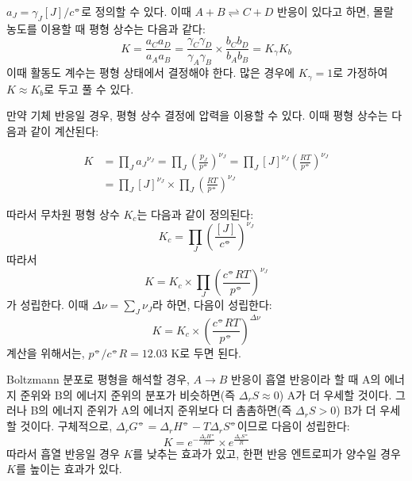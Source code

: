         $a_J = \gamma_J \left[ J \right]/c^\circlehbar$로 정의할 수 있다. 이때 $A+B\rightleftharpoons C+D$ 반응이 있다고 하면, 몰랄 농도를 이용할 때 평형 상수는 다음과 같다:
        \begin{equation*}
            K = \frac{a_C a_D}{a_A a_B} = \frac{\gamma_C \gamma_D}{\gamma_A \gamma_B}\times\frac{b_C b_D}{b_A b_B} = K_\gamma K_b
        \end{equation*}
        이때 활동도 계수는 평형 상태에서 결정해야 한다. 많은 경우에 $K_\gamma = 1$로 가정하여 $K \approx K_b$로 두고 풀 수 있다.
        \par 만약 기체 반응일 경우, 평형 상수 결정에 압력을 이용할 수 있다. 이때 평형 상수는 다음과 같이 계산된다:
        \begin{obs}[압력 평형 상수]
        \begin{equation*}
            \begin{aligned}
                K &= \prod_J {a_J}^{\nu_J} = \prod_J \left(\frac{p_J}{p^\circlehbar}\right)^{\nu_J} = \prod_J \left[J\right]^{\nu_J}\left(\frac{RT}{p^\circlehbar}\right)^{\nu_J}\\
                &= \prod_J \left[J\right]^{\nu_J}\times\prod_J \left(\frac{RT}{p^\circlehbar}\right)^{\nu_J}
            \end{aligned}
        \end{equation*}
        \end{obs}
        따라서 무차원 평형 상수 $K_c$는 다음과 같이 정의된다:
        \begin{equation*}
            K_c = \prod_J\left(\frac{\left[J\right]}{c^\circlehbar}\right)^{\nu_J}
        \end{equation*}
        따라서
        \begin{equation*}
            K= K_c \times \prod_J\left(\frac{c^\circlehbar RT}{p^\circlehbar}\right)^{\nu_J}
        \end{equation*}
        가 성립한다. 이때 $\Delta \nu = \sum_J \nu_J$라 하면, 다음이 성립한다:
        \begin{equation*}
            K = K_c \times \left(\frac{c^\circlehbar RT}{p^\circlehbar}\right)^{\Delta\nu}
        \end{equation*}
        계산을 위해서는, $p^\circlehbar / c^\circlehbar R = 12.03$ K로 두면 된다.
        \par Boltzmann 분포로 평형을 해석할 경우, $A\rightarrow B$ 반응이 흡열 반응이라 할 때 A의 에너지 준위와 B의 에너지 준위의 분포가 비슷하면(즉 $\Delta_r S \approx 0$) 
        A가 더 우세할 것이다. 그러나 B의 에너지 준위가 A의 에너지 준위보다 더 촘촘하면(즉 $\Delta_r S > 0$) B가 더 우세할 것이다. 구체적으로, 
        $\Delta_r G^\circlehbar = \Delta_r H^\circlehbar - T \Delta_r S^\circlehbar$이므로 다음이 성립한다:
        \begin{equation*}
            K = e^{-\frac{\Delta_r H^\circlehbar}{RT}}\times e^{\frac{\Delta_r S^\circlehbar}{R}}
        \end{equation*}
        따라서 흡열 반응일 경우 $K$를 낮추는 효과가 있고, 한편 반응 엔트로피가 양수일 경우 $K$를 높이는 효과가 있다.
